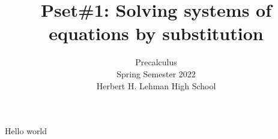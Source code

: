 \documentclass{exam}
\title{Pset\#1: Solving systems of equations by substitution }
\author{Precalculus \\ Spring Semester 2022 \\ Herbert H. Lehman High School}
\begin{document}
Hello world
\end{document}
